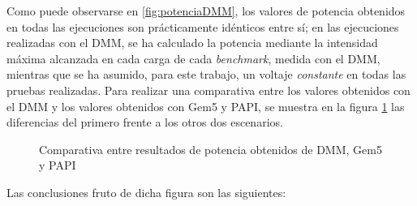 Como puede observarse en \ref{fig:potenciaDMM}, los valores de potencia obtenidos en todas las ejecuciones son prácticamente idénticos entre sí; en las ejecuciones realizadas con el DMM, se ha calculado la potencia mediante la intensidad máxima alcanzada en cada carga de cada \textit{benchmark}, medida con el DMM, mientras que se ha asumido, para este trabajo, un voltaje \emph{constante} en todas las pruebas realizadas. Para realizar una comparativa entre los valores obtenidos con el DMM y los valores obtenidos con Gem5 y PAPI, se muestra en la figura \ref{fig:diferenciaPotenciaDMM} las diferencias del primero frente a los otros dos escenarios.

\begin{figure}[H]
    \centering
    \caption{Comparativa entre resultados de potencia obtenidos de DMM, Gem5 y PAPI}
    \label{fig:diferenciaPotenciaDMM}
\end{figure}

Las conclusiones fruto de dicha figura son las siguientes:

